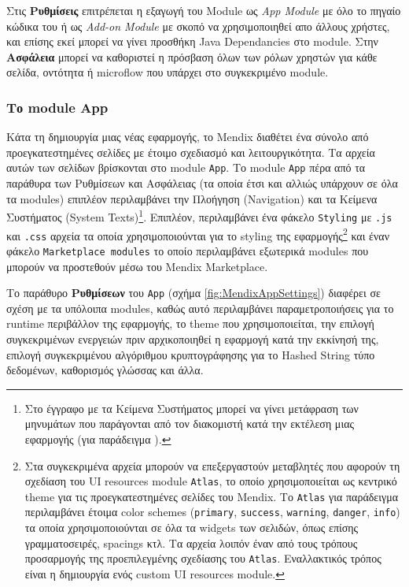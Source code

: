             Στις \textbf{Ρυθμίσεις} επιτρέπεται η εξαγωγή του Module ως \textit{App Module} με όλο το πηγαίο κώδικα του ή ως \textit{Add-on Module} με σκοπό να χρησιμοποιηθεί απο άλλους χρήστες, και επίσης εκεί μπορεί να γίνει προσθήκη Java Dependancies στο module. Στην \textbf{Ασφάλεια} μπορεί να καθοριστεί η πρόσβαση όλων των ρόλων χρηστών για κάθε σελίδα, οντότητα ή microflow που υπάρχει στο συγκεκριμένο module.

            \subsubsection{Το module App}
            Κάτα τη δημιουργία μιας νέας εφαρμογής, το Mendix διαθέτει ένα σύνολο από προεγκατεστημένες σελίδες με έτοιμο σχεδιασμό και λειτουργικότητα. Τα αρχεία αυτών των σελίδων βρίσκονται στο module \texttt{App}. Το module \texttt{App} πέρα από τα παράθυρα των Ρυθμίσεων και Ασφάλειας (τα οποία έτσι και αλλιώς υπάρχουν σε όλα τα modules) επιπλέον περιλαμβάνει την Πλοήγηση (Navigation) και τα Κείμενα Συστήματος (System Texts)\footnote{Στο έγγραφο με τα Κείμενα Συστήματος μπορεί να γίνει μετάφραση των μηνυμάτων που παράγονται από τον διακομιστή κατά την εκτέλεση μιας εφαρμογής (για παράδειγμα ).}. Επιπλέον, περιλαμβάνει ένα φάκελο \texttt{Styling} με \texttt{.js} και \texttt{.css} αρχεία τα οποία χρησιμοποιούνται για το styling της εφαρμογής\footnote{Στα συγκεκριμένα αρχεία μπορούν να επεξεργαστούν μεταβλητές που αφορούν τη σχεδίαση του UI resources module \texttt{Atlas}, το οποίο χρησιμοποιείται ως κεντρικό theme για τις προεγκατεστημένες σελίδες του Mendix. Το \texttt{Atlas} για παράδειγμα περιλαμβάνει έτοιμα color schemes (\texttt{primary}, \texttt{success}, \texttt{warning}, \texttt{danger}, \texttt{info}) τα οποία χρησιμοποιούνται σε όλα τα widgets των σελιδών, όπως επίσης γραμματοσειρές, spacings κτλ. Τα αρχεία λοιπόν έναν από τους τρόπους προσαρμογής της προεπιλεγμένης σχεδίασης του \texttt{Atlas}. Εναλλακτικός τρόπος είναι η δημιουργία ενός custom UI resources module.} και έναν φάκελο \texttt{Marketplace modules} το οποίο περιλαμβάνει εξωτερικά modules που μπορούν να προστεθούν μέσω του Mendix Marketplace.

            Το παράθυρο \textbf{Ρυθμίσεων} του \texttt{App} (σχήμα \ref{fig:MendixAppSettings}) διαφέρει σε σχέση με τα υπόλοιπα modules, καθώς αυτό περιλαμβάνει παραμετροποιήσεις για το runtime περιβάλλον της εφαρμογής, το theme που χρησιμοποιείται, την επιλογή συγκεκριμένων ενεργειών πριν αρχικοποιηθεί η εφαρμογή κατά την εκκίνησή της, επιλογή συγκεκριμένου αλγόριθμου κρυπτογράφησης για το Hashed String τύπο δεδομένων, καθορισμός γλώσσας και άλλα.

